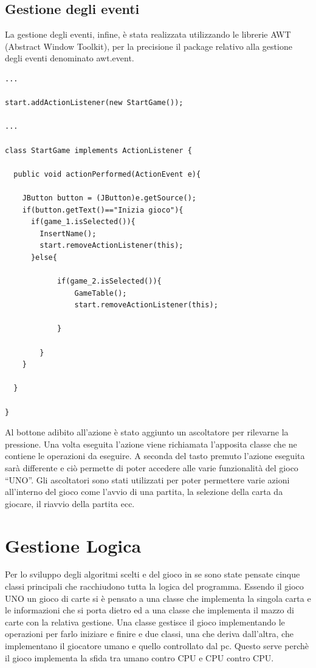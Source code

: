 	\subsection{Gestione degli eventi}
		La gestione degli eventi, infine, è stata realizzata utilizzando le librerie AWT (Abstract Window Toolkit), per la precisione il package relativo alla gestione degli eventi denominato awt.event. 
\begin{lstlisting}
...

start.addActionListener(new StartGame());

...

class StartGame implements ActionListener {
		
  public void actionPerformed(ActionEvent e){
	
    JButton button = (JButton)e.getSource();
    if(button.getText()=="Inizia gioco"){
	  if(game_1.isSelected()){
		InsertName();
		start.removeActionListener(this);
	  }else{
		
			if(game_2.isSelected()){
				GameTable();
				start.removeActionListener(this);
			
			}
		
		}
    }
	
  }

}

\end{lstlisting}

		Al bottone adibito all'azione è stato aggiunto un ascoltatore per rilevarne la pressione. Una volta eseguita l'azione viene richiamata l'apposita classe che ne contiene le operazioni da eseguire. A seconda del tasto premuto l'azione eseguita sarà differente e ciò permette di poter accedere alle varie funzionalità del gioco “UNO”. Gli ascoltatori sono stati utilizzati per poter permettere varie azioni all’interno del gioco come l’avvio di una partita, la selezione della carta da giocare, il riavvio della partita ecc.
		
		
		
\section{Gestione Logica}		
	Per lo sviluppo degli algoritmi scelti e del gioco in se sono state pensate cinque classi principali che racchiudono tutta la logica del programma. Essendo il gioco UNO un gioco di carte si è pensato a una classe che implementa la singola carta e le informazioni che si porta dietro ed a una classe che implementa il mazzo di carte con la relativa gestione. Una classe gestisce il gioco implementando le operazioni per farlo iniziare e finire e due classi, una che deriva dall'altra, che implementano il giocatore umano e quello controllato dal pc. Questo serve perchè il gioco implementa la sfida tra umano contro CPU e CPU contro CPU.
	
